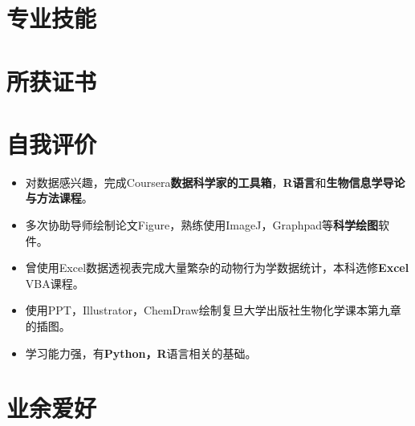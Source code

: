 \documentclass[11pt,a4paper]{moderncv}
\begin{document}
 \section{专业技能}
 \section{所获证书}

 \section{自我评价}
 \begin{itemize}
 	\item 对数据感兴趣，完成Coursera\textbf{数据科学家的工具箱}，\textbf{R语言}和\textbf{生物信息学导论与方法课程}。
 	\item 多次协助导师绘制论文Figure，熟练使用ImageJ，Graphpad等\textbf{科学绘图}软件。
 	\item 曾使用Excel数据透视表完成大量繁杂的动物行为学数据统计，本科选修\textbf{Excel} VBA课程。
 	\item 使用PPT，Illustrator，ChemDraw绘制复旦大学出版社生物化学课本第九章的插图。
 	\item 学习能力强，有\textbf{Python，R}语言相关的基础。
\end{itemize}
 \section{业余爱好}
 
 
\end{document}
